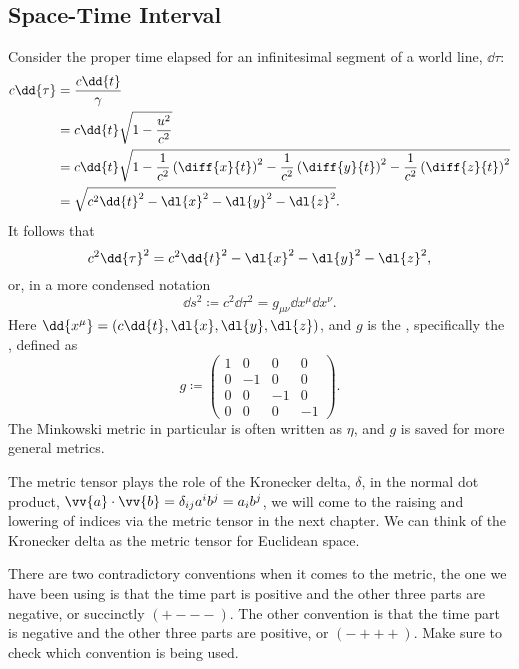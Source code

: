 \documentclass[fleqn]{NotesClass}
\begin{document}
    \subsection{Space-Time Interval}
    Consider the proper time elapsed for an infinitesimal segment of a world line, \(\dd{\tau}\):
    \begin{align}
        c\dd{\tau} &= \frac{c\dd{t}}{\gamma}\\
        &= c\dd{t}\sqrt{1 - \frac{u^2}{c^2}}\\
        &= c\dd{t}\sqrt{1 - \frac{1}{c^2}\left( \diff{x}{t} \right)^2 - \frac{1}{c^2}\left( \diff{y}{t} \right)^2 - \frac{1}{c^2}\left( \diff{z}{t} \right)^2}\\
        &= \sqrt{c^2\dd{t}^2 - \dl{x}^2 - \dl{y}^2 - \dl{z}^2}.
    \end{align}
    It follows that
    \begin{equation}
        c^2\dd{\tau}^2 = c^2\dd{t}^2 - \dl{x}^2 - \dl{y}^2 - \dl{z}^2,
    \end{equation}
    or, in a more condensed notation
    \begin{equation}
        \dd{s}^2 \coloneqq c^2\dd{\tau}^2 = g_{\mu\nu}\dd{x^\mu}\dd{x^\nu}.
    \end{equation}
    Here \(\dd{x^\mu} = (c\dd{t}, \dl{x}, \dl{y}, \dl{z})\), and \(g\) is the , specifically the , defined as
    \begin{equation}
        g \coloneqq 
        \begin{pmatrix}
            1 & 0 & 0 & 0\\
            0 & -1 & 0 & 0\\
            0 & 0 & -1 & 0\\
            0 & 0 & 0 & -1
        \end{pmatrix}
        .
    \end{equation}
    The Minkowski metric in particular is often written as \(\eta\), and \(g\) is saved for more general metrics.
    
    The metric tensor plays the role of the Kronecker delta, \(\delta\), in the normal dot product, \(\vv{a}\cdot\vv{b} = \delta_{ij}a^ib^j = a_ib^j\), we will come to the raising and lowering of indices via the metric tensor in the next chapter.
    We can think of the Kronecker delta as the metric tensor for Euclidean space.
    
    \begin{wrn}
        There are two contradictory conventions when it comes to the metric, the one we have been using is that the time part is positive and the other three parts are negative, or succinctly \(({+}{-}{-}{-})\).
        The other convention is that the time part is negative and the other three parts are positive, or \(({-}{+}{+}{+})\).
        Make sure to check which convention is being used.
    \end{wrn}
    
\end{document}
